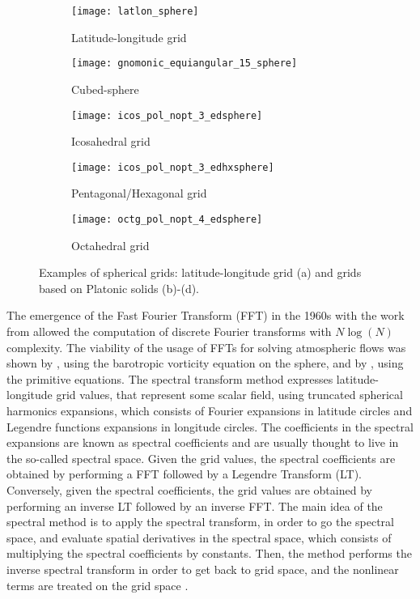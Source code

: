 \begin{figure}
  \centering
  \begin{subfigure}{.3\linewidth}
    \centering
    \texttt{[image: latlon\_sphere]}
      \caption{Latitude-longitude grid}\label{latlon-grid}
  \end{subfigure}%
  \hspace{1em}%
  \begin{subfigure}{.3\linewidth}
    \centering
    \texttt{[image: gnomonic\_equiangular\_15\_sphere]}
      \caption{Cubed-sphere}\label{cs-grid}
  \end{subfigure}%
  \hspace{2em}%
  \begin{subfigure}{.3\linewidth}
    \centering
    \texttt{[image: icos\_pol\_nopt\_3\_edsphere]}
	  \caption{Icosahedral grid}\label{icos-grid}
  \end{subfigure}
  \begin{subfigure}{.3\linewidth}
    \centering
    \texttt{[image: icos\_pol\_nopt\_3\_edhxsphere]}
	  \caption{Pentagonal/Hexagonal grid}\label{voronoi-grid}
  \end{subfigure}
  \begin{subfigure}{.3\linewidth}
    \centering
    \texttt{[image: octg\_pol\_nopt\_4\_edsphere]}
	  \caption{Octahedral grid}\label{octg-grid}
  \end{subfigure}
  \caption{Examples of spherical grids: latitude-longitude grid (a) and grids based on Platonic solids (b)-(d).}
\end{figure}

The emergence of the Fast Fourier Transform (FFT) in the 1960s with the work from 
\citet{cooley:1965} allowed the computation of discrete Fourier transforms with
$N\log(N)$ complexity. 
The viability of the usage of FFTs for solving atmospheric flows was shown by \citet{orszag:1970},
using the barotropic vorticity equation on the sphere, and by \citet{eliasen:1970}, using
the primitive equations.
The spectral transform method expresses latitude-longitude grid values, that represent some scalar field,
using truncated spherical harmonics expansions, which consists of Fourier expansions 
in latitude circles and Legendre functions expansions in longitude circles. 
The coefficients in the spectral expansions are known
as spectral coefficients and are usually thought to live in the so-called spectral space.
Given the grid values, the spectral coefficients are obtained by performing a FFT followed by a 
Legendre Transform (LT). 
Conversely, given the spectral coefficients,
the grid values are obtained by performing an inverse LT followed by an inverse FFT.
The main idea of the spectral method is to apply the spectral transform, in order to 
go the spectral space, and evaluate spatial derivatives in the spectral space, which
consists of multiplying the spectral coefficients by constants. 
Then, the method performs the inverse spectral transform
in order to get back to grid space, and the nonlinear terms are treated on the grid space
\citep{krishnamurti:2006}.

